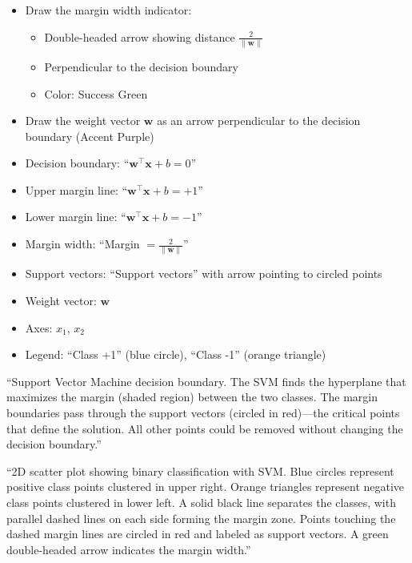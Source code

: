 \documentclass[12pt]{article}
\begin{document}
\begin{description}[style=nextline, leftmargin=0pt]
\begin{itemize}
\begin{itemize}
            \item These should include points from both classes
        \end{itemize}
        \item Draw the margin width indicator:
        \begin{itemize}
            \item Double-headed arrow showing distance $\frac{2}{\|\mathbf{w}\|}$
            \item Perpendicular to the decision boundary
            \item Color: Success Green
        \end{itemize}
        \item Draw the weight vector $\mathbf{w}$ as an arrow perpendicular to the decision boundary (Accent Purple)
    \end{itemize}

    \item[Required Labels]
    \begin{itemize}
        \item Decision boundary: ``$\mathbf{w}^\top \mathbf{x} + b = 0$''
        \item Upper margin line: ``$\mathbf{w}^\top \mathbf{x} + b = +1$''
        \item Lower margin line: ``$\mathbf{w}^\top \mathbf{x} + b = -1$''
        \item Margin width: ``Margin $= \frac{2}{\|\mathbf{w}\|}$''
        \item Support vectors: ``Support vectors'' with arrow pointing to circled points
        \item Weight vector: $\mathbf{w}$
        \item Axes: $x_1$, $x_2$
        \item Legend: ``Class +1'' (blue circle), ``Class -1'' (orange triangle)
    \end{itemize}

    \item[Caption Text]
    ``Support Vector Machine decision boundary. The SVM finds the hyperplane that maximizes the margin (shaded region) between the two classes. The margin boundaries pass through the support vectors (circled in red)---the critical points that define the solution. All other points could be removed without changing the decision boundary.''

    \item[Alt-Text for Accessibility]
    ``2D scatter plot showing binary classification with SVM. Blue circles represent positive class points clustered in upper right. Orange triangles represent negative class points clustered in lower left. A solid black line separates the classes, with parallel dashed lines on each side forming the margin zone. Points touching the dashed margin lines are circled in red and labeled as support vectors. A green double-headed arrow indicates the margin width.''
\end{description}
\end{document}
